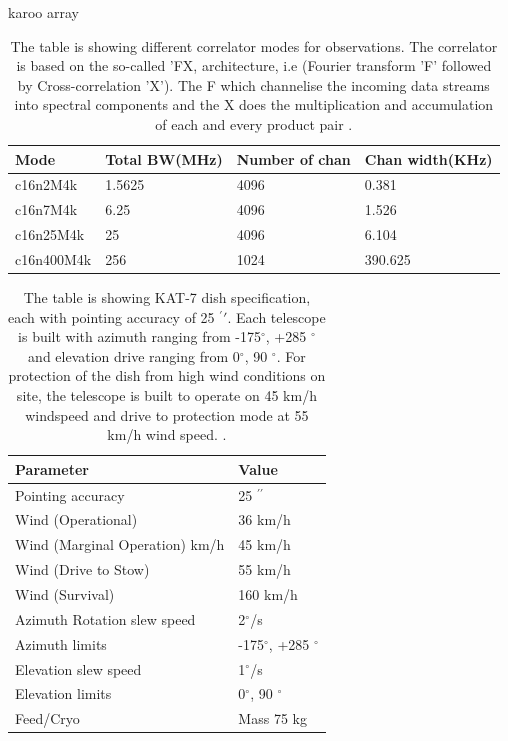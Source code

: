 karoo array
\begin{table}[H]\centering
\begin{tabular}{l l l l}
\toprule
\textbf{Mode}& \textbf{Total BW(MHz)} & \textbf{Number of chan} & \textbf{Chan width(KHz)} \\
\midrule
c16n2M4k  &  1.5625	& 4096& 	0.381\\
c16n7M4k & 6.25 & 	4096& 	1.526\\
c16n25M4k& 	25&	4096& 	6.104\\
c16n400M4k&  256& 	1024& 	390.625\\
\bottomrule
\end{tabular}
\caption{The table is showing different correlator modes for observations. The correlator is based
on the so-called 'FX, architecture, i.e (Fourier transform 'F' followed
by Cross-correlation 'X'). The F  which channelise the incoming data streams
into spectral components and the X does the multiplication and accumulation of each and every product pair \citep{foley2016engineering}.}
\label{K7 modes}
\end{table}



\begin{table}[H]\centering
\begin{tabular}{l l }
\toprule
\textbf{Parameter} & \textbf{Value}\\
\midrule
Pointing accuracy & 25 $^{\prime \prime}$ \\
Wind (Operational) & 36 km/h\\
Wind (Marginal Operation) km/h & 45 km/h\\
Wind (Drive to Stow) & 55 km/h\\
Wind (Survival) & 160 km/h\\
Azimuth Rotation slew speed &  2$^\circ$/s\\
Azimuth limits & -175$^{\circ}$, +285 $^{\circ}$\\
Elevation slew speed & 1$^{\circ}$/s\\
Elevation limits & 0$^{\circ}$, 90 $^{\circ}$\\
Feed/Cryo & Mass 75 kg\\
\bottomrule
\end{tabular}
\caption{The table is showing KAT-7 dish specification, each with pointing accuracy of 25 $^\prime \prime$. Each telescope is built with azimuth ranging from -175$^{\circ}$, +285 $^{\circ}$ and elevation drive ranging from 0$^{\circ}$, 90 $^{\circ}$. For protection of the dish from high wind conditions on site, the telescope is built to operate on 45 km/h windspeed and drive to protection mode at 55 km/h wind speed. \citep{foley2016engineering}.}
\label{DSpec}
\end{table}

